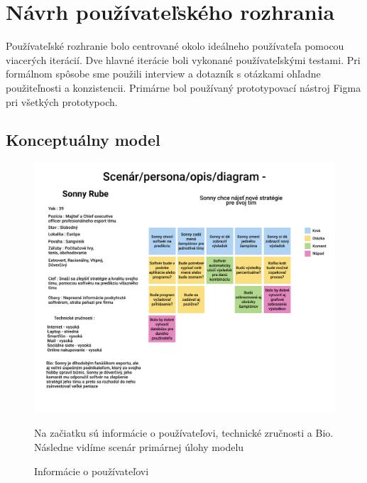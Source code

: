 {}
\chapter{Návrh používateľského rozhrania}

\label{summary}

Používateľské rozhranie bolo centrované okolo ideálneho používateľa pomocou viacerých iterácií. Dve hlavné iterácie boli vykonané používateľskými testami. Pri formálnom spôsobe sme použili interview a dotazník s otázkami ohľadne použiteľnosti a konzistencii. Primárne bol používaný prototypovací nástroj Figma pri všetkých prototypoch.



\section{Konceptuálny model}



\begin{figure}[h!]
	
	\includegraphics[width=.9\textwidth]{figures/scenar}
	
	\centering
	
	\caption{ Informácie o používateľovi \label{scenar}}
	
	Na začiatku sú informácie o používateľovi, technické zručnosti a Bio. Následne vidíme scenár primárnej úlohy modelu
	
\end{figure}



